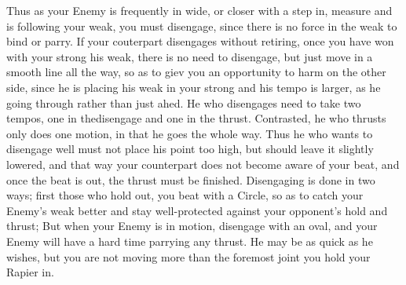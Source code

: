 
Thus as your Enemy is frequently in wide, or closer with a step in,
measure and is following your weak, you must disengage, since there is no
force in the weak to bind or parry. If your couterpart disengages without
retiring, once you have won with your strong his weak, there is no
need to disengage, but just move in a smooth line all the way, so as to
giev you an opportunity to harm on the other side, since he is placing
his weak in your strong and his tempo is larger, as he going through
rather than just ahed. He who disengages need to take two tempos, one in
thedisengage and one in the thrust. Contrasted, he who thrusts only does
one motion, in that he goes the whole way. Thus he who wants to disengage
well must not place his point too high, but should leave it slightly
lowered, and that way your counterpart does not become aware of your
beat, and once the beat is out, the thrust must be finished. Disengaging
is done in two ways; first those who hold out, you beat with a Circle,
so as to catch your Enemy's weak better and stay well-protected
against your opponent's hold and thrust; But when your Enemy is in
motion, disengage with an oval, and your Enemy will have a hard time
parrying any thrust. He may be as quick as he wishes, but you are not
moving more than the foremost joint you hold your Rapier in.

